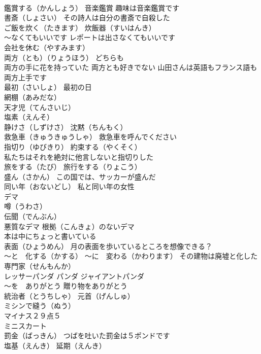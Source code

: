 \documentclass[8pt]{extreport}
\begin{document}
\begin{CJK}{UTF8}{min}
\\	鑑賞する（かんしょう） 音楽鑑賞 趣味は音楽鑑賞です
\\	書斎（しょさい） その詩人は自分の書斎で自殺した
\\	ご飯を炊く（たきます） 炊飯器（すいはんき）
\\	～なくてもいいです レポートは出さなくてもいいです
\\	会社を休む（やすみます）
\\	両方（とも）（りょうほう） どちらも
\\	両方の手に花を持っていた 両方とも好きでない 山田さんは英語もフランス語も両方上手です
\\	最初（さいしょ） 最初の日
\\	網棚（あみだな）
\\	天才児（てんさいじ）
\\	塩素（えんそ）
\\	静けさ（しずけさ） 沈黙（ちんもく）
\\	救急車（きゅうきゅうしゃ） 救急車を呼んでください
\\	指切り（ゆびきり） 約束する（やくそく）
\\	私たちはそれを絶対に他言しないと指切りした
\\	旅をする（たび） 旅行をする（りょこう）
\\	盛ん（さかん） この国では、サッカーが盛んだ
\\	同い年（おないどし） 私と同い年の女性
\\	デマ 
\\	噂（うわさ）
\\	伝聞（でんぶん）
\\	悪質なデマ 根拠（こんきょ）のないデマ
\\	本は中にちょっと書いている
\\	表面（ひょうめん） 月の表面を歩いているところを想像できる？
\\	～と　化する（かする） ～に　変わる（かわります） その建物は廃墟と化した
\\	専門家（せんもんか）
\\	レッサーパンダ パンダ ジャイアントパンダ
\\	～を　ありがとう 贈り物をありがとう
\\	統治者（とうちしゃ） 元首（げんしゅ）
\\	ミシンで縫う（ぬう）
\\	マイナス２９点５
\\	ミニスカート
\\	罰金（ばっきん） つばを吐いた罰金は５ポンドです
\\	塩基（えんき） 延期（えんき）

\end{CJK}
\end{document}
